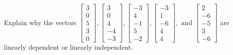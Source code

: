 \documentclass{article}
\begin{document}
\begin{exerciseStatement}
    Explain why the vectors \(\left[\begin{array}{r}
3 \\
0 \\
5 \\
3 \\
0
\end{array}\right] , \left[\begin{array}{r}
3 \\
0 \\
4 \\
-4 \\
-3
\end{array}\right] , \left[\begin{array}{r}
-3 \\
4 \\
-1 \\
5 \\
-2
\end{array}\right] , \left[\begin{array}{r}
-3 \\
1 \\
-6 \\
4 \\
4
\end{array}\right] , \text{ and } \left[\begin{array}{r}
2 \\
-6 \\
-5 \\
3 \\
-6
\end{array}\right]\) are linearly dependent or linearly independent.


  
\end{exerciseStatement}
\end{document}
